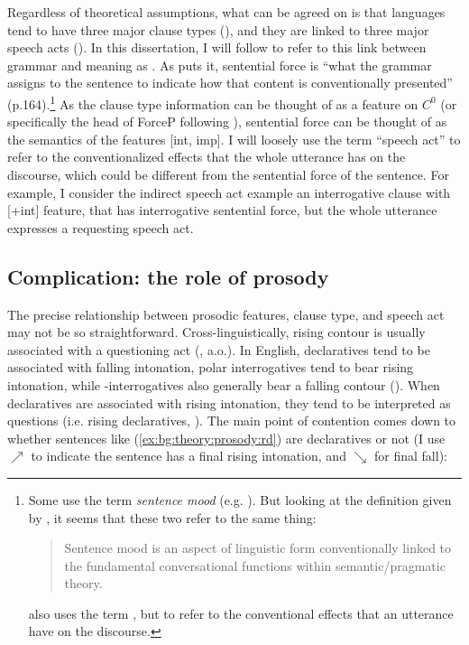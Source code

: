 Regardless of theoretical assumptions, what can be agreed on is that languages tend to have three major clause types (\diis{}), and they are linked to three major speech acts (\aqrs{}). In this dissertation, I will follow \textcite{chierchia1990textbook} to refer to this link between grammar and meaning as . As \textcite{chierchia1990textbook} puts it, sentential force is ``what the grammar assigns to the sentence to indicate how that content is conventionally presented'' (p.164).\footnote{Some use the term \emph{sentence mood} (e.g. \cite{portner2018}). But looking at the definition given by \textcite{portner2018}, it seems that these two refer to the same thing:
\begin{quote}
Sentence mood is an aspect of linguistic form conventionally linked to the fundamental conversational functions within semantic/pragmatic theory.\\
\hspace*{\fill} \hfill \textcite[p.122]{portner2018}
\end{quote}
\cite{portner2018} also uses the term , but to refer to the conventional effects that an utterance have on the discourse.  
} As the clause type information can be thought of as a feature on $C^{0}$ (or specifically the head of ForceP following \cite{rizzi1997}), sentential force can be thought of as the semantics of the features [\textpm int, \textpm imp]. I will loosely use the term ``speech act'' to refer to the conventionalized effects that the whole utterance has on the discourse, which could be different from the sentential force of the sentence. For example, I consider the indirect speech act example  an interrogative clause with [+int] feature, that has interrogative sentential force, but the whole utterance expresses a requesting speech act. 






\subsection{Complication: the role of prosody}
\label{sec:bg:theory:prosody}

The precise relationship between prosodic features, clause type, and speech act may not be so straightforward. Cross-linguistically, rising contour is usually associated with a questioning act (\citealt{bolinger1978, ladd1981, gussenhovenchen2000, ladd2001typology}, a.o.). In English, declaratives tend to be associated with falling intonation, polar interrogatives tend to bear rising intonation, while \twh-interrogatives also generally bear a falling contour (\citealt{ladd1981, hedberg2014corpus}). When declaratives are associated with rising intonation, they tend to be interpreted as questions (i.e. rising declaratives, \citealt{ladd1981,gunlogson2004,gunlogson2008,jeong2018,rudin2018,goodhue2021rd}). The main point of contention comes down to whether sentences like (\ref{ex:bg:theory:prosody:rd}) are declaratives or not (I use $\nearrow$ to indicate the sentence has a final rising intonation, and $\searrow$ for final fall):
 
